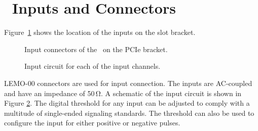 \section{\deviceName\ Inputs and Connectors}
    Figure~\ref{fig:bracket} shows the location of the inputs on the slot
    bracket.  %
    \begin{figure}[htb]
        \centering
            \caption{
                Input connectors of the \deviceName\ on the PCIe
                bracket.%
                \label{fig:bracket}
            }
    \end{figure}
    \begin{figure}[htb]
        \centering
            \caption{
                Input circuit for each of the input
                channels.
                \label{fig:inputcirc}
            }
    \end{figure}

    LEMO-00 connectors are used for input connection. The inputs are AC-coupled
    and have an impedance of 50\,Ω.  A schematic of the input circuit is shown
    in Figure \ref{fig:inputcirc}.  The digital threshold for any input can be
    adjusted to comply with a multitude of single-ended signaling standards. 
    The threshold can also be used to configure the input for either positive
    or negative pulses.
    
